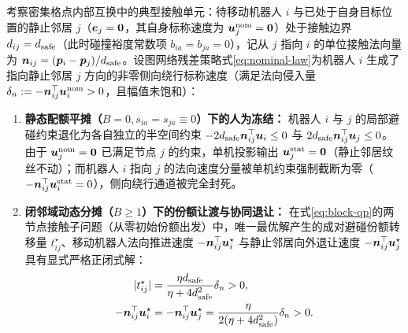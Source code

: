 \begin{proposition}[闭邻域动态份额转移对静止阻挡邻居的协同解冻性质]\label{prop:unfreeze}
考察密集格点内部互换中的典型接触单元：待移动机器人 $i$ 与已处于自身目标位置的静止邻居 $j$（$\boldsymbol{e}_j=\boldsymbol 0$，其自身标称速度为 $\boldsymbol{u}_j^{\mathrm{nom}}=\boldsymbol 0$）处于接触边界 $d_{ij}=d_{\mathrm{safe}}$（此时碰撞裕度常数项 $b_{ia}=b_{ja}=0$），记从 $j$ 指向 $i$ 的单位接触法向量为 $\boldsymbol n_{ij}=(\boldsymbol{p}_i-\boldsymbol{p}_j)/d_{\mathrm{safe}}$。设图网络残差策略式\eqref{eq:nominal-law}为机器人 $i$ 生成了指向静止邻居 $j$ 方向的非零侧向绕行标称速度（满足法向侵入量 $\delta_n := -\boldsymbol n_{ij}^{\top}\boldsymbol{u}_i^{\mathrm{nom}}>0$，且幅值未饱和）：
\begin{enumerate}
 \item \textbf{静态配额平摊（$B=0, s_{ia}=s_{ja}\equiv 0$）下的人为冻结：} 机器人 $i$ 与 $j$ 的局部避碰约束退化为各自独立的半空间约束 $-2d_{\mathrm{safe}}\boldsymbol n_{ij}^{\top}\boldsymbol{u}_i\le 0$ 与 $2d_{\mathrm{safe}}\boldsymbol n_{ij}^{\top}\boldsymbol{u}_j\le 0$。由于 $\boldsymbol{u}_j^{\mathrm{nom}}=\boldsymbol 0$ 已满足节点 $j$ 的约束，单机投影输出 $\boldsymbol{u}_j^{\mathrm{stat}}=\boldsymbol 0$（静止邻居纹丝不动）；而机器人 $i$ 指向 $j$ 的法向速度分量被单机约束强制截断为零（$-\boldsymbol n_{ij}^{\top}\boldsymbol{u}_i^{\mathrm{stat}}=0$），侧向绕行通道被完全封死。
 \item \textbf{闭邻域动态分摊（$B\ge 1$）下的份额让渡与协同退让：} 在式\eqref{eq:block-qp}的两节点接触子问题（从零初始份额出发）中，唯一最优解产生的成对避碰份额转移量 $t_{ij}^\star$、移动机器人法向推进速度 $-\boldsymbol n_{ij}^{\top}\boldsymbol{u}_i^\star$ 与静止邻居向外退让速度 $-\boldsymbol n_{ij}^{\top}\boldsymbol{u}_j^\star$ 具有显式严格正闭式解：
 \begin{equation}
\begin{split}
  |t_{ij}^\star| &= \frac{\eta d_{\mathrm{safe}}}{\eta+4d_{\mathrm{safe}}^2}\delta_n > 0,\\
  -\boldsymbol n_{ij}^{\top}\boldsymbol{u}_i^\star &= -\boldsymbol n_{ij}^{\top}\boldsymbol{u}_j^\star = \frac{\eta}{2(\eta+4d_{\mathrm{safe}}^2)}\delta_n > 0.
\end{split}
  \label{eq:joint-yield}
 \end{equation}
\end{enumerate}
\end{proposition}
